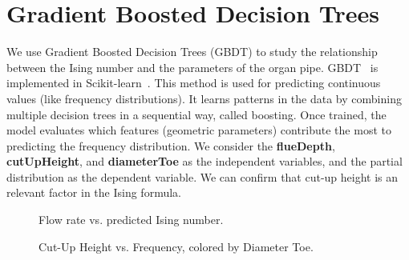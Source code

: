 \documentclass{psu-report}
\begin{document}
\section{Gradient Boosted Decision Trees}

We use Gradient Boosted Decision Trees (GBDT) to study the relationship
between the Ising number and the parameters of the organ pipe.
GBDT~\autocite{2001Fri-1} is implemented in Scikit-learn~\autocite{2016Kra-1}.
This method is used for predicting continuous values (like frequency
distributions).
It learns patterns in the data by combining multiple decision trees in a
sequential way, called boosting.
Once trained, the model evaluates which features (geometric parameters)
contribute the most to predicting the frequency distribution.
We consider the \textbf{flueDepth}, \textbf{cutUpHeight}, and
\textbf{diameterToe} as the independent variables, and the
partial distribution as the dependent variable.
We can confirm that cut-up height is an relevant factor in the Ising formula.

\begin{figure}[htbp]
    \centering
    \caption{Flow rate vs. predicted Ising number.}
\end{figure}

\begin{figure}[htbp]
    \centering
    \caption{Cut-Up Height vs. Frequency, colored by Diameter Toe.}
\end{figure}
\end{document}
